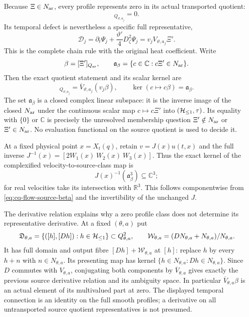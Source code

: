Because $\Xi\in N_{\rm ar}$, every profile represents zero in its actual
transported quotient:
\begin{equation}
 [\Psi_j]_{Q_{\vartheta,a_j}}=0.
 \label{eq:cq-flow-profile-zero}
\end{equation}
Its temporal defect is nevertheless a specific full representative,
\[
 \mathcal D_j=\partial_t\Psi_j+
              \frac{\vartheta'}4D_\zeta^2\Psi_j
             =v_jV_{\vartheta,a_j}\Xi'.
\]
This is the complete chain rule with the original heat coefficient.
Write
\[
 \beta=[\Xi']_{Q_{\rm ar}},\qquad
 \mathfrak a_\beta=\{c\in\mathbb C:c\Xi'\in N_{\rm ar}\}.
\]
Then the exact quotient statement and its scalar kernel are
\begin{equation}
 [\mathcal D_j]_{Q_{\vartheta,a_j}}
    =\overline V_{\vartheta,a_j}(v_j\beta),\qquad
 \ker(c\mapsto c\beta)=\mathfrak a_\beta .
 \label{eq:cq-flow-source-beta}
\end{equation}
The set $\mathfrak a_\beta$ is a closed complex linear subspace:
it is the inverse image of the closed $N_{\rm ar}$ under the continuous
scalar map $c\mapsto c\Xi'$ into $(\mathcal H_{\leq 1},\tau)$.
Its equality with $\{0\}$ or $\mathbb C$ is precisely the unresolved
membership question $\Xi'\notin N_{\rm ar}$ or $\Xi'\in N_{\rm ar}$.
No evaluation functional on the source quotient is used to decide it.

At a fixed physical point $x=X_t(q)$, retain
$v=J(x)u(t,x)$ and the full inverse
$J^{-1}(x)=[2W_1(x)\ W_2(x)\ W_3(x)]$. Thus the exact kernel of
the complexified velocity-to-source-class map is
\[
 J(x)^{-1}(\mathfrak a_\beta^3)\subseteq\mathbb C^3;
\]
for real velocities take its intersection with $\mathbb R^3$.
This follows componentwise from \eqref{eq:cq-flow-source-beta} and
the invertibility of the unchanged $J$.

The derivative relation explains why a zero profile class does not
determine its representative derivative. At a fixed $(\theta,a)$ put
\[
 \mathfrak D_{\theta,a}
 =\{([h],[Dh]):h\in\mathcal H_{\leq 1}\}\subset Q_{\theta,a}^2,\qquad
 \mathcal W_{\theta,a}
 =(DN_{\theta,a}+N_{\theta,a})/N_{\theta,a}.
\]
It has full domain and output fibre $[Dh]+\mathcal W_{\theta,a}$
at $[h]$: replace $h$ by every $h+n$ with $n\in N_{\theta,a}$.
Its presenting map has kernel
$\{h\in N_{\theta,a}:Dh\in N_{\theta,a}\}$.
Since $D$ commutes with $V_{\theta,a}$, conjugating both components
by $\overline V_{\theta,a}$ gives exactly the previous source
derivative relation and its ambiguity space. In particular
$\overline V_{\theta,a}\beta$ is an actual element of its
multivalued part at zero. The displayed temporal connection is an
identity on the full smooth profiles; a derivative on all
untransported source quotient representatives is not presumed.

